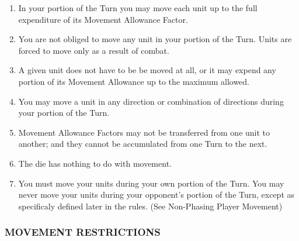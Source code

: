 \begin{enumerate}
  \item In your portion of the Turn you may move each unit up to the full expenditure of its Movement Allowance Factor.

  \item You are not obliged to move any unit in your portion of the Turn. Units are forced to move only as a result of combat.

  \item A given unit does not have to be be moved at all, or it may expend any portion of its Movement Allowance up to the maximum allowed.

  \item You may move a unit in any direction or combination of directions during your portion of the Turn.

  \item Movement Allowance Factors may not be transferred from one unit to another; and they cannot be accumulated from one Turn to the next.

  \item The die has nothing to do with movement.

  \item You must move your units during your own portion of the Turn. You may never move your units during your opponent's portion of the Turn, except as specificaly defined later in the rules. (See Non-Phasing Player Movement)
\end{enumerate}

\subsubsection{MOVEMENT RESTRICTIONS}

